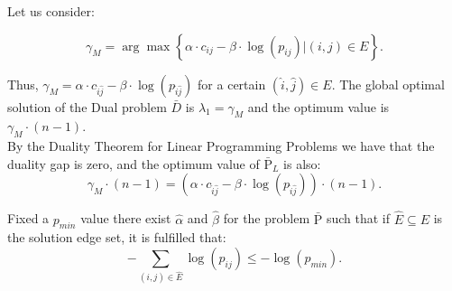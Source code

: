 Let us consider:

\[\gamma_{M}=\arg\max\left\{\alpha\cdot c_{ij}-\beta\cdot \log(p_{ij})|(i,j)\in E \right\}. \]

Thus, $\gamma_{M}=\alpha\cdot c_{\hat{i}\hat{j}}-\beta\cdot
\log(p_{\hat{i}\hat{j}})$ for a certain $(\hat{i},\hat{j})\in E$.
The global optimal solution of the Dual problem $\bar{D}$ is
$\lambda_{1}=\gamma_{M}$ and the optimum value is $\gamma_{M}\cdot
(n-1)$.\\

By the Duality Theorem for Linear Programming Problems we have
that the duality gap is zero, and the optimum value of
$\bar{\mathrm{P}}_{L}$ is also: \[ \gamma_{M}\cdot
(n-1)=(\alpha\cdot c_{\hat{i}\hat{j}}-\beta\cdot
\log(p_{\hat{i}\hat{j}}))\cdot (n-1). \]

\begin{theorem} Fixed a $p_{min}$ value there exist $\hat{\alpha}$ and
$\hat{\beta}$ for the problem $\bar{\mathrm{P}}$ such that if
$\hat{E}\subseteq E$ is the solution edge set, it is fulfilled
that:\\
\[-\sum_{(i,j)\in \hat{E}} \log(p_{ij})\leq -\log(p_{min}).\]
\end{theorem}
